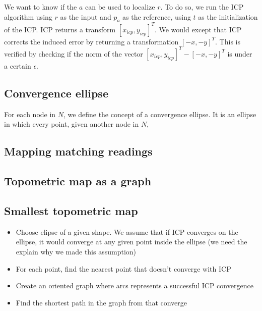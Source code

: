 \documentclass[letterpaper,10 pt,conference]{ieeeconf}
\begin{document}
We want to know if the $a$ can be used to localize $r$. To do so, we run the ICP algorithm using $r$ as the input and $p_a$ as the reference, using $t$
as the initialization of the ICP. ICP returns a transform $[x_{icp}, y_{icp}]^T$. We would except that ICP corrects the induced error by returning
a transformation $[-x, -y]^T$. This is verified by checking if the norm of the vector $[x_{icp}, y_{icp}]^T - [-x, -y]^T$ is under a certain $\epsilon$.


\subsection{Convergence ellipse}
For each node in $N$, we define the concept of a convergence ellipse.
It is an ellipse in which every point, given another node in $N$,

\subsection{Mapping matching readings}

\subsection{Topometric map as a graph}

\subsection{Smallest topometric map}

\begin{itemize}
  \item Choose elipse of a given shape. We assume that if ICP converges on the
    ellipse, it would converge at any given point inside the ellipse (we need the explain why we made this assumption)

  \item For each point, find the nearest point that doesn't converge with ICP

  \item Create an oriented graph where arcs represents a successful ICP convergence

  \item Find the shortest path in the graph from that converge

\end{itemize}
\end{document}
